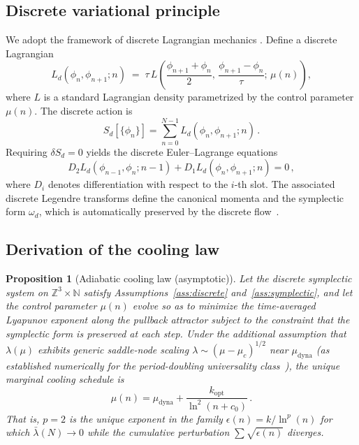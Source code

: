 \documentclass[twocolumn,showpacs,preprintnumbers,amsmath,amssymb,prd]{revtex4-2}
\newtheorem{proposition}{Proposition}
\newcommand{\lnq}{\ln^2}
\newcommand{\ZZ}{\mathbb{Z}}
\newcommand{\NN}{\mathbb{N}}
\begin{document}
\subsection{Discrete variational principle}
\label{sec:variational}

We adopt the framework of discrete Lagrangian mechanics
\cite{MarsdenWest2001,LewMarsdenOrtizWest2003}.
Define a discrete Lagrangian
\begin{equation}
  L_d(\phi_n, \phi_{n+1}; n)
  \;=\; \tau\, L\!\left(\frac{\phi_{n+1}+\phi_n}{2},\,
    \frac{\phi_{n+1}-\phi_n}{\tau};\, \mu(n)\right),
  \label{eq:Ld}
\end{equation}
where $L$ is a standard Lagrangian density parametrized by the
control parameter $\mu(n)$.
The discrete action is
\begin{equation}
  S_d[\{\phi_n\}] = \sum_{n=0}^{N-1} L_d(\phi_n, \phi_{n+1}; n)\,.
  \label{eq:action}
\end{equation}
Requiring $\delta S_d = 0$ yields the discrete Euler--Lagrange
equations
\begin{equation}
  D_2 L_d(\phi_{n-1},\phi_n; n{-}1) + D_1 L_d(\phi_n,\phi_{n+1}; n) = 0\,,
  \label{eq:DEL}
\end{equation}
where $D_i$ denotes differentiation with respect to the $i$-th
slot.
The associated discrete Legendre transforms define the canonical
momenta and the symplectic form $\omega_d$, which is automatically
preserved by the discrete flow~\cite{MarsdenWest2001}.

\subsection{Derivation of the cooling law}
\label{sec:cooling}

\begin{proposition}[Adiabatic cooling law (asymptotic)]
\label{prop:cooling}
Let the discrete symplectic system on $\ZZ^3 \times \NN$ satisfy
Assumptions~\ref{ass:discrete} and~\ref{ass:symplectic}, and let
the control parameter $\mu(n)$ evolve so as to minimize the
time-averaged Lyapunov exponent along the pullback attractor
subject to the constraint that the symplectic form is preserved
at each step.
Under the additional assumption that $\lambda(\mu)$ exhibits
generic saddle-node scaling $\lambda \sim (\mu-\mu_c)^{1/2}$
near $\mu_{\mathrm{dyna}}$ (as established numerically for the
period-doubling universality class~\cite{Feigenbaum1978}),
the unique marginal cooling schedule is
\begin{equation}
  \mu(n) = \mu_{\mathrm{dyna}} + \frac{k_{\mathrm{opt}}}{\lnq(n+c_0)}\,.
  \label{eq:cooling_prop}
\end{equation}
That is, $p=2$ is the unique exponent in the family
$\epsilon(n) = k/\ln^p(n)$ for which $\bar\lambda(N)\to 0$
while the cumulative perturbation $\sum\sqrt{\epsilon(n)}$
diverges.
\end{proposition}
\end{document}
